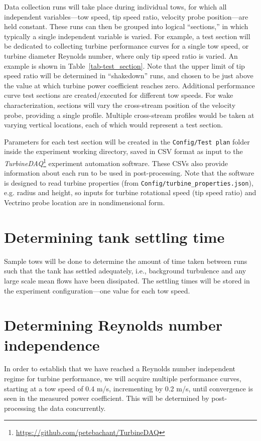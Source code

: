 \documentclass[12pt,letterpaper]{scrreprt}
\begin{document}
Data collection runs will take place during individual tows, for which all
independent variables---tow speed, tip speed ratio, velocity probe
position---are held constant. These runs can then be grouped into logical
``sections,'' in which typically a single independent variable is varied. For
example, a test section will be dedicated to collecting turbine performance
curves for a single tow speed, or turbine diameter Reynolds number, where only
tip speed ratio is varied. An example is shown in Table~\ref{tab-test_section}.
Note that the upper limit of tip speed ratio will be determined in ``shakedown''
runs, and chosen to be just above the value at which turbine power coefficient
reaches zero. Additional performance curve test sections are created/executed
for different tow speeds. For wake characterization, sections will vary the
cross-stream position of the velocity probe, providing a single profile.
Multiple cross-stream profiles would be taken at varying vertical locations,
each of which would represent a test section.

Parameters for each test section will be created in the \texttt{Config/Test
plan} folder inside the experiment working directory, saved in CSV format as
input to the
\textit{TurbineDAQ}\footnote{\url{https://github.com/petebachant/TurbineDAQ}}
experiment automation software. These CSVs also provide information about each
run to be used in post-processing. Note that the software is designed to read
turbine properties (from \texttt{Config/turbine\_properties.json}), e.g. radius
and height, so inputs for turbine rotational speed (tip speed ratio) and
Vectrino probe location are in nondimensional form.


\section{Determining tank settling time}

Sample tows will be done to determine the amount of time taken between runs such
that the tank has settled adequately, i.e., background turbulence and any large
scale mean flows have been dissipated. The settling times will be stored in the
experiment configuration---one value for each tow speed.


\section{Determining Reynolds number independence}

In order to establish that we have reached a Reynolds number independent regime
for turbine performance, we will acquire multiple performance curves, starting
at a tow speed of 0.4 m/s, incrementing by 0.2 m/s, until
convergence is seen in the measured power coefficient. This will be determined
by post-processing the data concurrently.
\end{document}
